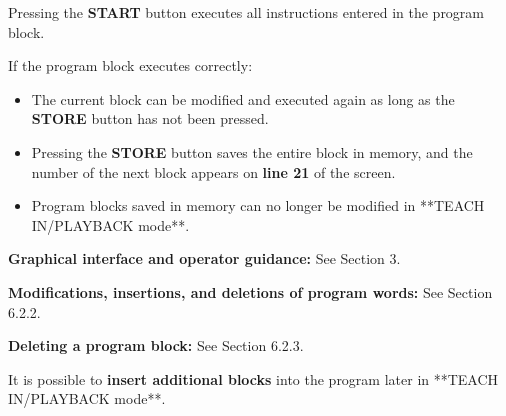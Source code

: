 \vspace{.5cm}

\begin{itemize}
\end{itemize}

Pressing the \textbf{START} button executes all instructions entered in the program block.

If the program block executes correctly:

\begin{itemize}
\end{itemize}

\vspace{.5cm}

\begin{itemize}
\end{itemize}

\newpage

\notes

\begin{itemize}
    \item The current block can be modified and executed again as long as the \textbf{STORE} button has not been pressed.
    \item Pressing the \textbf{STORE} button saves the entire block in memory, and the number of the next block appears on \textbf{line 21} of the screen.
    \item Program blocks saved in memory can no longer be modified in **TEACH IN/PLAYBACK mode**.
\end{itemize}

\textbf{Graphical interface and operator guidance:} See Section 3.

\textbf{Modifications, insertions, and deletions of program words:} See Section 6.2.2.

\textbf{Deleting a program block:} See Section 6.2.3.

It is possible to \textbf{insert additional blocks} into the program later in **TEACH IN/PLAYBACK mode**.

\procedure

\begin{itemize}
\end{itemize}

